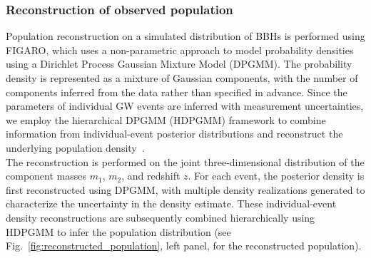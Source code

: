 \documentclass[linenumbers,amsmath,trackchanges]{aastex702}
\begin{document}
\subsubsection{Reconstruction of observed population}
Population reconstruction on a simulated distribution of BBHs is performed using FIGARO, which uses a 
non-parametric approach to model probability densities using a Dirichlet Process Gaussian Mixture Model 
(DPGMM). The probability density is represented as a mixture of Gaussian components, with the number of 
components inferred from the data rather than specified in advance. Since the parameters of individual 
GW events are inferred with measurement uncertainties, we employ the hierarchical DPGMM (HDPGMM) framework 
to combine information from individual-event posterior distributions and reconstruct the underlying 
population density~\citep{RinaldiDelPozzo2022}.\\
The reconstruction is performed on the joint three-dimensional distribution of the component masses $m_1$, 
$m_2$, and redshift $z$. For each event, the posterior density is first reconstructed using DPGMM, with 
multiple density realizations generated to characterize the uncertainty in the density estimate. These 
individual-event density reconstructions are subsequently combined hierarchically using HDPGMM to infer 
the population distribution
(see Fig.~\ref{fig:reconstructed_population}, left panel, for the reconstructed population). 
\end{document}
